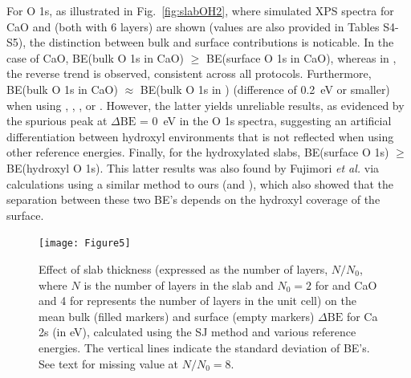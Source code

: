 \documentclass[%
aip,
amsmath,amssymb,
preprint,%
jcp,
showkeys,
]{revtex4-2}
\def\dbe{\ensuremath{\Delta\text{BE}}}
\begin{document}
For O 1s, as illustrated in Fig.~\ref{fig:slabOH2}, where simulated XPS spectra for CaO and  (both with 6 layers) are shown  (values are also provided in Tables S4-S5), the distinction between bulk and surface contributions is noticable. In the case of CaO, BE(bulk O 1s in CaO) $\geq$ BE(surface O 1s in CaO), whereas in , the reverse trend is observed, consistent across all protocols. Furthermore, BE(bulk O 1s in CaO) $\approx$ BE(bulk O 1s in ) (difference of \SI{0.2}{\electronvolt} or smaller) when using , , , or . However, the latter yields unreliable results, as evidenced by the spurious peak at \dbe{} = \SI{0}{\electronvolt} in the O 1s spectra, suggesting an artificial differentiation between hydroxyl environments that is not reflected when using other reference energies. Finally, for the hydroxylated slabs, BE(surface O 1s) $\geq$ BE(hydroxyl O 1s). This latter results was also found by Fujimori \emph{et al.} \cite{fujimoriInteractionWaterCaO2016a} via calculations using a similar method to ours (and ), which also showed that the separation between these two BE's depends on the hydroxyl coverage of the surface.



\begin{figure}[p]
	\centering
	\texttt{[image: Figure5]}
	\caption{Effect of slab thickness (expressed as the number of layers, $N/N_0$, where $N$ is the number of layers in the slab and $N_0 = 2$ for  and CaO and 4 for  represents the number of layers in the unit cell)  on the mean bulk (filled markers) and surface (empty markers) \dbe{} for Ca 2s (in \si{\electronvolt}), calculated using the SJ method and various reference energies. The vertical lines indicate the standard deviation of BE's. See text for missing value at $N/N_0=8$.}
	\label{fig:slabsthicknessSJ}
\end{figure}
\end{document}
